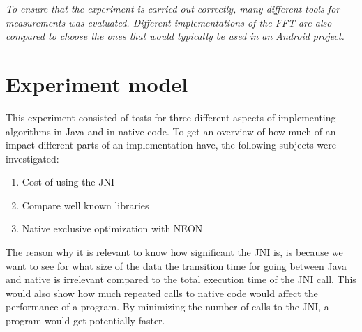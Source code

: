 \textit{To ensure that the experiment is carried out correctly, many different tools for measurements was evaluated. Different implementations of the FFT are also compared to choose the ones that would typically be used in an Android project.}

\section{Experiment model}

This experiment consisted of tests for three different aspects of implementing algorithms in Java and in native code. To get an overview of how much of an impact different parts of an implementation have, the following subjects were investigated:

\begin{enumerate}
    \item Cost of using the JNI
    \item Compare well known libraries
    \item Native exclusive optimization with NEON
\end{enumerate}

The reason why it is relevant to know how significant the JNI is, is because we want to see for what size of the data the transition time for going between Java and native is irrelevant compared to the total execution time of the JNI call. This would also show how much repeated calls to native code would affect the performance of a program. By minimizing the number of calls to the JNI, a program would get potentially faster.


